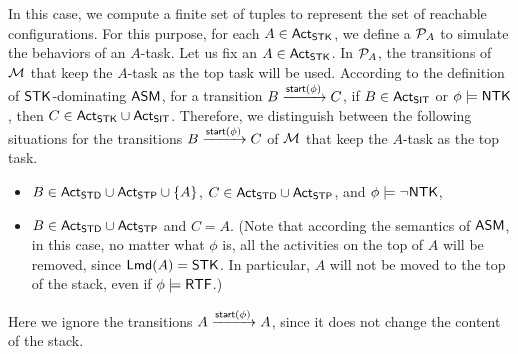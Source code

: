 In this case, we compute a finite set of {\WOTrNFA} tuples to represent the set of reachable configurations.
For this purpose, for each $A \in {\sf Act}_{\sf STK}$, we define a {\WOTrPDS} ${\mathcal{P} }_A$ to simulate the behaviors of an $A$-task. 
Let us fix an $A \in {\sf Act}_{\sf STK}$. In ${\mathcal{P} }_A$, the transitions of ${\mathcal{M} }$ that keep the $A$-task as the top task will be used. According to the definition of ${\sf STK}$-dominating $\textsf{ASM}$, for a transition $B \xrightarrow{{\mathsf{start} }(\phi)} C$, if $B \in {\sf Act}_{\sf SIT}$ or $\phi \models {\sf NTK}$, then $C \in {\sf Act}_{\sf STK} \cup {\sf Act}_{\sf SIT}$. Therefore, we distinguish between the following situations for the transitions $B \xrightarrow{{\mathsf{start} }(\phi)} C$ of ${\mathcal{M} }$ that keep the $A$-task as the top task. 
\begin{itemize}
\item $B \in {\sf Act}_{\sf STD} \cup {\sf Act}_{\sf STP} \cup \{A\}$, $C \in {\sf Act}_{\sf STD} \cup {\sf Act}_{\sf STP}$, and $\phi \models \neg {\sf NTK}$,
%
\item $B \in {\sf Act}_{\sf STD} \cup {\sf Act}_{\sf STP}$ and $C = A$. (Note that according the semantics of $\textsf{ASM}$, in this case, no matter what $\phi$ is, all the activities on the top of $A$ will be removed, since ${\sf Lmd}(A) = {\sf STK}$. In particular, $A$ will not be moved to the top of the stack, even if $\phi \models {\sf RTF}$.)
\end{itemize}
Here we ignore the transitions $A \xrightarrow{{\mathsf{start} }(\phi)} A$, since it does not change the content of the stack. 

